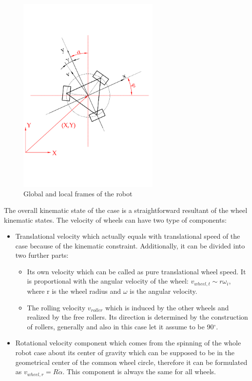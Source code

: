 \documentclass[12pt,english,twoside]{article}
\begin{document}
\begin{figure}[htb!]
	\centering
	\includegraphics[width=7cm]{figures/global_local_frame}
	\caption{Global and local frames of the robot}
	\label{global_local_frame}
\end{figure}
The overall kinematic state of the case is a straightforward resultant of the wheel kinematic states. The velocity of wheels can have two type of components:
\begin{itemize}
	\item Translational velocity which actually equals with translational speed of the case because of the kinematic constraint. Additionally, it can be divided into two further parts:
		\begin{itemize}
			\item Its own velocity which can be called as pure translational wheel speed. It is proportional with the angular velocity of the wheel: $v_{wheel,t} \sim r \omega_i$, where r is the wheel radius and $\omega$ is the angular velocity.
			\item The rolling velocity $v_{roller}$ which is induced by the other wheels and realized by the free rollers. Its direction is determined by the construction of rollers, generally and also in this case let it assume to be 90$^{\circ}$.
		\end{itemize}
	\item Rotational velocity component which comes from the spinning of the whole robot case about its center of gravity which can be supposed to be in the geometrical center of the common wheel circle, therefore it can be formulated as $v_{wheel,r}  = R \dot \alpha$. This component is always the same for all wheels.
\end{itemize}
\end{document}
